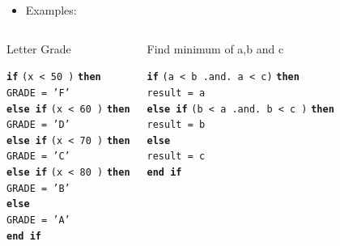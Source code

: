 \documentclass[slidestop,mathserif,compress,xcolor=svgnames]{beamer}
\newenvironment{bblock}[0]
{
\begin{beamerboxesrounded}[upper=uppercol1,lower=lowercol1,shadow=true]}
{\end{beamerboxesrounded}}
\begin{document}
\begin{frame}[allowframebreaks]
  \framebreak
  \begin{itemize}
    \item Examples:
  \end{itemize}
  \begin{columns}
    \column{4cm}
    \begin{bblock}{Letter Grade}
      {\tiny
      \begin{tabbing}
        \textbf{\texttt{if}} \=\texttt{(x < 50 )} \textbf{\texttt{then}} \\
        \> \texttt{GRADE = 'F'} \\
        \textbf{\texttt{else if}} \texttt{(x < 60 )} \textbf{\texttt{then}} \\
        \> \texttt{GRADE = 'D'} \\
        \textbf{\texttt{else if}} \texttt{(x < 70 )} \textbf{\texttt{then}} \\
        \> \texttt{GRADE = 'C'} \\
        \textbf{\texttt{else if}} \texttt{(x < 80 )} \textbf{\texttt{then}} \\
        \> \texttt{GRADE = 'B'} \\
        \textbf{\texttt{else}} \\
        \> \texttt{GRADE = 'A'} \\
        \textbf{\texttt{end if}}
      \end{tabbing}
      }
    \end{bblock}
    \column{6cm}
    \begin{bblock}{Find minimum of a,b and c}
      {\tiny
      \begin{tabbing}
        \textbf{\texttt{if}} \=\texttt{(a < b .and. a < c)} \textbf{\texttt{then}} \\
        \> \texttt{result = a} \\
        \textbf{\texttt{else if}} \texttt{(b < a  .and. b < c )} \textbf{\texttt{then}}\\
        \> \texttt{result = b} \\
        \textbf{\texttt{else}} \\
        \> \texttt{result = c} \\
        \textbf{\texttt{end if}}
      \end{tabbing}
      }
    \end{bblock}
  \end{columns}
  

\end{frame}
\end{document}
